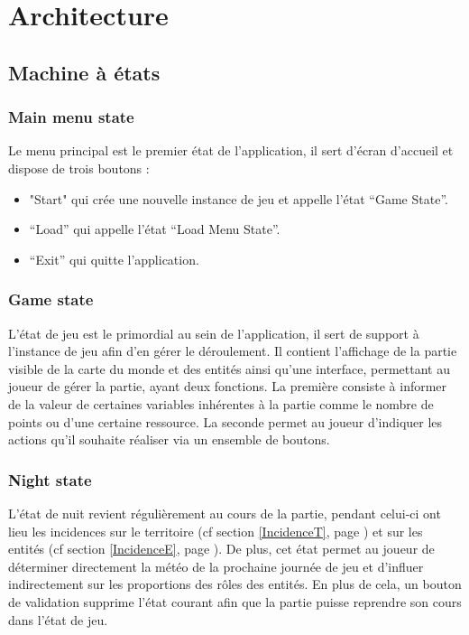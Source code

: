 \documentclass[a4paper]{article}
\newcommand{\alinea}{\hspace*{0.5cm}}
\begin{document}
	\section{Architecture}
	
		\subsection{Machine à états}
			\subsubsection{Main menu state}
				\alinea
		Le menu principal est le premier état de l’application, il sert d’écran d’accueil et dispose de trois boutons :
	 		        \begin{itemize}[label=-] 
			             \item "Start" qui crée une nouvelle instance de jeu et appelle l’état “Game State”.
			             \item “Load” qui appelle l’état “Load Menu State”.
				   \item“Exit” qui quitte l’application.
			        \end{itemize}
			\subsubsection{Game state}
				\alinea L’état de jeu est le primordial au sein de l’application, il sert de support à l’instance de jeu afin d’en gérer le déroulement. Il contient l’affichage de la partie visible de la carte du monde et des entités ainsi qu’une interface, permettant au joueur de gérer la partie, ayant deux fonctions. La première consiste à informer de la valeur de certaines variables inhérentes à la partie comme le nombre de points ou d’une certaine ressource. La seconde permet au joueur d’indiquer les actions qu’il souhaite réaliser via un ensemble de boutons.
			\subsubsection{Night state}
\alinea L’état de nuit revient régulièrement au cours de la partie, pendant celui-ci ont lieu les incidences sur le territoire (cf  section \ref{IncidenceT}, page \pageref{IncidenceT}) et sur les entités (cf  section \ref{IncidenceE}, page \pageref{IncidenceE}).
De plus, cet état permet au joueur de déterminer directement la météo de la prochaine journée de jeu et d’influer indirectement sur les proportions des rôles des entités. En plus de cela, un bouton de validation supprime l’état courant afin que la partie puisse reprendre son cours dans l’état de jeu.
\end{document}

